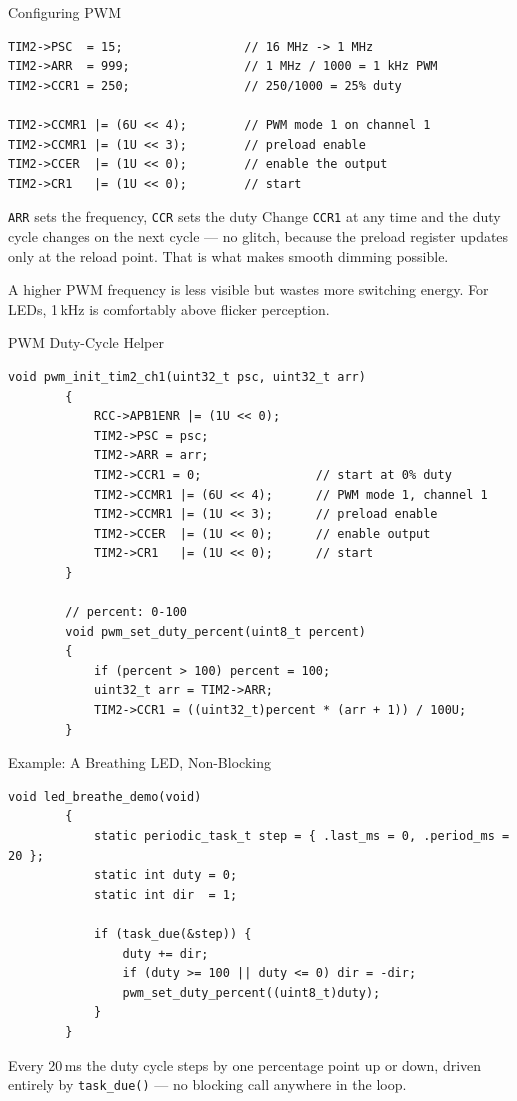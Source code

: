 \documentclass[9pt,aspectratio=169,xcolor=table]{beamer}
\begin{document}
\begin{frame}[fragile]{Configuring PWM}

\begin{lstlisting}[style=myc, basicstyle=\ttfamily\small]
TIM2->PSC  = 15;                 // 16 MHz -> 1 MHz
TIM2->ARR  = 999;                // 1 MHz / 1000 = 1 kHz PWM
TIM2->CCR1 = 250;                // 250/1000 = 25% duty

TIM2->CCMR1 |= (6U << 4);        // PWM mode 1 on channel 1
TIM2->CCMR1 |= (1U << 3);        // preload enable
TIM2->CCER  |= (1U << 0);        // enable the output
TIM2->CR1   |= (1U << 0);        // start
\end{lstlisting}

    \vspace{2mm}
    \begin{block}{\texttt{ARR} sets the frequency, \texttt{CCR} sets the duty}
        Change \texttt{CCR1} at any time and the duty cycle changes on the next
        cycle --- no glitch, because the preload register updates only at the
        reload point. \alert{That is what makes smooth dimming possible.}
    \end{block}

    \vspace{1mm}
    {\small A higher PWM frequency is less visible but wastes more switching
    energy. For LEDs, 1\,kHz is comfortably above flicker perception.}
\end{frame}


\begin{frame}[fragile]{PWM Duty-Cycle Helper}
\begin{lstlisting}[style=myc, basicstyle=\ttfamily\small]
		void pwm_init_tim2_ch1(uint32_t psc, uint32_t arr)
		{
			RCC->APB1ENR |= (1U << 0);
			TIM2->PSC = psc;
			TIM2->ARR = arr;
			TIM2->CCR1 = 0;                // start at 0% duty
			TIM2->CCMR1 |= (6U << 4);      // PWM mode 1, channel 1
			TIM2->CCMR1 |= (1U << 3);      // preload enable
			TIM2->CCER  |= (1U << 0);      // enable output
			TIM2->CR1   |= (1U << 0);      // start
		}

		// percent: 0-100
		void pwm_set_duty_percent(uint8_t percent)
		{
			if (percent > 100) percent = 100;
			uint32_t arr = TIM2->ARR;
			TIM2->CCR1 = ((uint32_t)percent * (arr + 1)) / 100U;
		}
	\end{lstlisting}
\end{frame}

\begin{frame}[fragile]{Example: A Breathing LED, Non-Blocking}
\begin{lstlisting}[style=myc, basicstyle=\ttfamily\small]
		void led_breathe_demo(void)
		{
			static periodic_task_t step = { .last_ms = 0, .period_ms = 20 };
			static int duty = 0;
			static int dir  = 1;

			if (task_due(&step)) {
				duty += dir;
				if (duty >= 100 || duty <= 0) dir = -dir;
				pwm_set_duty_percent((uint8_t)duty);
			}
		}
	\end{lstlisting}
	{\small Every 20\,ms the duty cycle steps by one percentage point up or
		down, driven entirely by \texttt{task\_due()} --- no blocking call
		anywhere in the loop.}
\end{frame}
\end{document}
